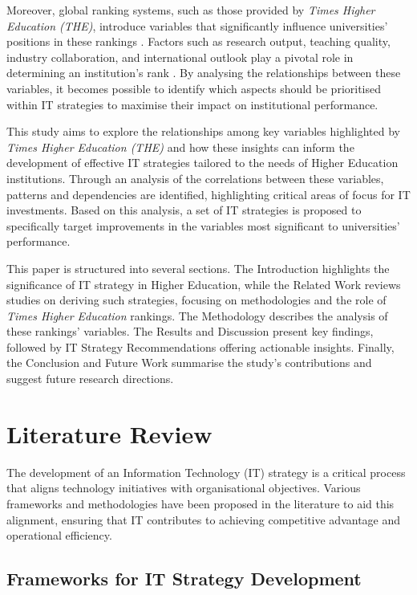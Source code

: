 \documentclass[conference]{IEEEtran}
\begin{document}
Moreover, global ranking systems, such as those provided by \textit{Times Higher Education (THE)}, introduce variables that significantly influence universities' positions in these rankings \cite{times2023methodology}. Factors such as research output, teaching quality, industry collaboration, and international outlook play a pivotal role in determining an institution’s rank \cite{times2022rankings}. By analysing the relationships between these variables, it becomes possible to identify which aspects should be prioritised within IT strategies to maximise their impact on institutional performance.


This study aims to explore the relationships among key variables highlighted by \textit{Times Higher Education (THE)} and how these insights can inform the development of effective IT strategies tailored to the needs of Higher Education institutions. Through an analysis of the correlations between these variables, patterns and dependencies are identified, highlighting critical areas of focus for IT investments. Based on this analysis, a set of IT strategies is proposed to specifically target improvements in the variables most significant to universities' performance.

This paper is structured into several sections. The Introduction highlights the significance of IT strategy in Higher Education, while the Related Work reviews studies on deriving such strategies, focusing on methodologies and the role of \textit{Times Higher Education} rankings. The Methodology describes the analysis of these rankings' variables. The Results and Discussion present key findings, followed by IT Strategy Recommendations offering actionable insights. Finally, the Conclusion and Future Work summarise the study's contributions and suggest future research directions.


\section{Literature Review}
\label{sec:literature_review}

The development of an Information Technology (IT) strategy is a critical process that aligns technology initiatives with organisational objectives. Various frameworks and methodologies have been proposed in the literature to aid this alignment, ensuring that IT contributes to achieving competitive advantage and operational efficiency.

\subsection{Frameworks for IT Strategy Development}
\end{document}
